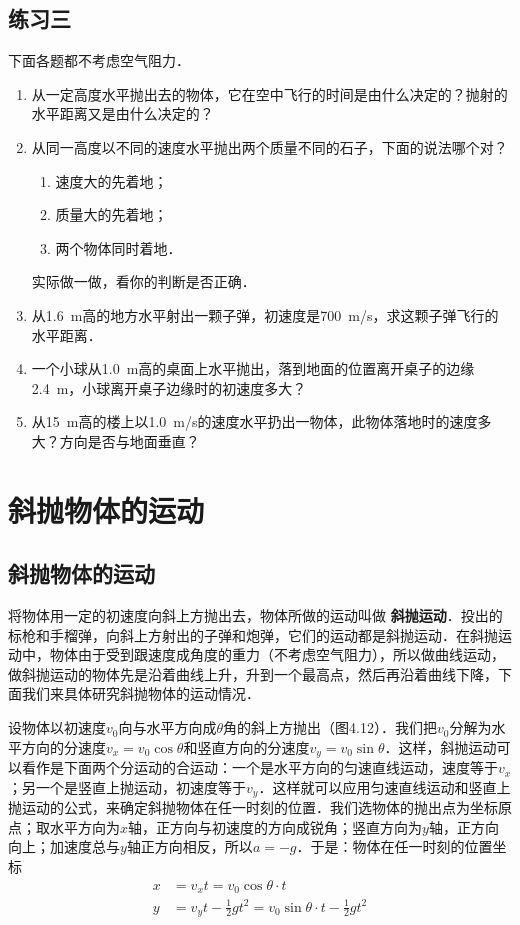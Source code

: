 \subsection*{练习三}

下面各题都不考虑空气阻力．
\begin{enumerate}
    \item 从一定高度水平抛出去的物体，它在空中飞行的时间是由什么决定的？抛射的水平距离又是由什么决定的？
    \item 从同一高度以不同的速度水平抛出两个质量不同的石子，下面的说法哪个对？
          \begin{enumerate}
              \item 速度大的先着地；
              \item  质量大的先着地；
              \item 两个物体同时着地．
          \end{enumerate}
          实际做一做，看你的判断是否正确．

    \item 从\SI{1.6}{m}高的地方水平射出一颗子弹，初速度是\SI{700}{m/s}，求这颗子弹飞行的水平距离．
    \item 一个小球从\SI{1.0}{m}高的桌面上水平抛出，落到地面的位置离开桌子的边缘\SI{2.4}{m}，小球离开桌子边缘时的初速度多大？
    \item 从\SI{15}{m}高的楼上以\SI{1.0}{m/s}的速度水平扔出一物体，此物体落地时的速度多大？方向是否与地面垂直？
\end{enumerate}

\newpage
\section{斜抛物体的运动}

\subsection{斜抛物体的运动}

将物体用一定的初速度向斜上方抛出去，物体所做的运动叫做\textbf{ 斜抛运动}．投出的标枪和手榴弹，向斜上方射出的子弹和炮弹，它们的运动都是斜抛运动．在斜抛运动中，物体由于受到跟速度成角度的重力（不考虑空气阻力），所以做曲线运动，做斜抛运动的物体先是沿着曲线上升，升到一个最高点，然后再沿着曲线下降，下面我们来具体研究斜抛物体的运动情况．

设物体以初速度$v_0$向与水平方向成$\theta$角的斜上方抛出（图4.12）．我们把$v_0$分解为水平方向的分速度$v_x=v_0\cos\theta$和竖直方向的分速度$v_y=v_0\sin\theta$．这样，斜抛运动可以看作是下面两个分运动的合运动：一个是水平方向的匀速直线运动，速度等于$v_x$；另一个是竖直上抛运动，初速度等于$v_y$．这样就可以应用匀速直线运动和竖直上抛运动的公式，来确定斜抛物体在任一时刻的位置．我们选物体的抛出点为坐标原
点；取水平方向为$x$轴，正方向与初速度的方向成锐角；竖直方向为$y$轴，正方向向上；加速度总与$y$轴正方向相反，所以$a=-g$．于是：物体在任一时刻的位置坐标
\begin{align}
    x & =v_x t=v_0\cos\theta \cdot t                                 \\
    y & =v_y t-\frac{1}{2}gt^2=v_0\sin\theta \cdot t-\frac{1}{2}gt^2
\end{align}

